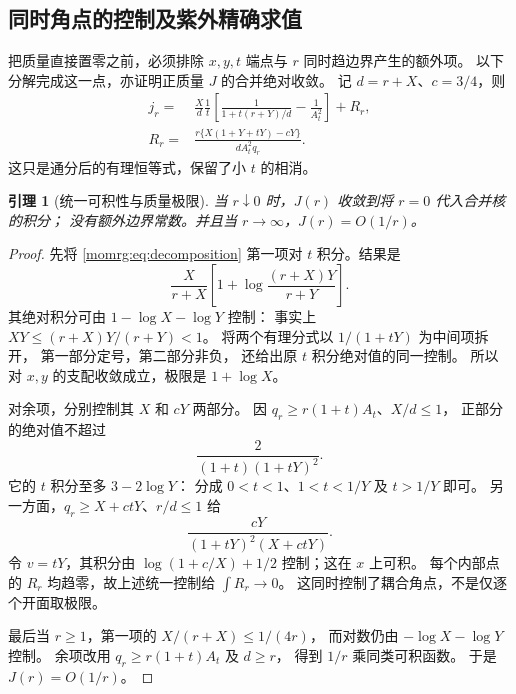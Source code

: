 \documentclass[11pt,a4paper,oneside]{ctexart}
\theoremstyle{cnplain}
\newtheorem{lemma}[theorem]{引理}
\theoremstyle{definition}
\theoremstyle{remark}
\numberwithin{equation}{section}
\begin{document}
\subsection{同时角点的控制及紫外精确求值}\label{momrg:sec:bounds}
把质量直接置零之前，必须排除 $x,y,t$ 端点与 $r$ 同时趋边界产生的额外项。
以下分解完成这一点，亦证明正质量 $J$ 的合并绝对收敛。
记 $d=r+X$、$c=3/4$，则
\begin{align}
 j_r={}&\frac{X}{d}\frac1t
 \left[\frac1{1+t(r+Y)/d}-\frac1{A_t^2}\right]
 +R_r,\label{momrg:eq:decomposition}\\
 R_r={}&\frac{r\{X(1+Y+tY)-cY\}}{d A_t^2q_r}.
                                                        \label{momrg:eq:R}
\end{align}
这只是通分后的有理恒等式，保留了小 $t$ 的相消。

\begin{lemma}[统一可积性与质量极限]\label{momrg:lem:domination}
当 $r\downarrow0$ 时，$J(r)$ 收敛到将 $r=0$ 代入合并核的积分；
没有额外边界常数。并且当 $r\to\infty$，$J(r)=O(1/r)$。
\end{lemma}
\begin{proof}
先将 \eqref{momrg:eq:decomposition} 第一项对 $t$ 积分。结果是
\begin{equation}\label{momrg:eq:main-integrated}
 \frac{X}{r+X}
       \left[1+\log\frac{(r+X)Y}{r+Y}\right].
\end{equation}
其绝对积分可由 $1-\log X-\log Y$ 控制：
事实上 $XY\leq(r+X)Y/(r+Y)<1$。
将两个有理分式以 $1/(1+tY)$ 为中间项拆开，
第一部分定号，第二部分非负，
还给出原 $t$ 积分绝对值的同一控制。
所以对 $x,y$ 的支配收敛成立，极限是 $1+\log X$。

对余项，分别控制其 $X$ 和 $cY$ 两部分。
因 $q_r\geq r(1+t)A_t$、$X/d\leq1$，
正部分的绝对值不超过
\begin{equation}\label{momrg:eq:Rplus-bound}
 \frac{2}{(1+t)(1+tY)^2}.
\end{equation}
它的 $t$ 积分至多 $3-2\log Y$：
分成 $0<t<1$、$1<t<1/Y$ 及 $t>1/Y$ 即可。
另一方面，$q_r\geq X+ctY$、$r/d\leq1$ 给
\begin{equation}\label{momrg:eq:Rminus-bound}
 \frac{cY}{(1+tY)^2(X+ctY)}.
\end{equation}
令 $v=tY$，其积分由
$\log(1+c/X)+1/2$ 控制；这在 $x$ 上可积。
每个内部点的 $R_r$ 均趋零，故上述统一控制给 $\int R_r\to0$。
这同时控制了耦合角点，不是仅逐个开面取极限。

最后当 $r\geq1$，第一项的 $X/(r+X)\leq1/(4r)$，
而对数仍由 $-\log X-\log Y$ 控制。
余项改用 $q_r\geq r(1+t)A_t$ 及 $d\geq r$，
得到 $1/r$ 乘同类可积函数。
于是 $J(r)=O(1/r)$。
\end{proof}
\end{document}
